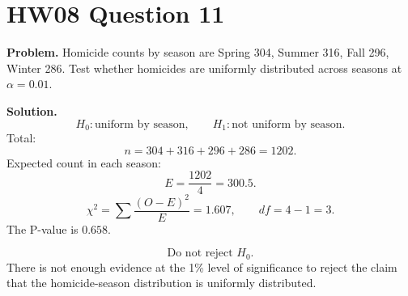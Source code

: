 \documentclass[11pt]{article}
\begin{document}
\section*{HW08 Question 11}

\textbf{Problem.} Homicide counts by season are Spring 304, Summer 316, Fall 296, Winter 286. Test whether homicides are uniformly distributed across seasons at \(\alpha=0.01\).

\textbf{Solution.}
\[
H_0:\text{uniform by season},\qquad H_1:\text{not uniform by season}.
\]
Total:
\[
n=304+316+296+286=1202.
\]
Expected count in each season:
\[
E=\frac{1202}{4}=300.5.
\]
\[
\chi^2=\sum\frac{(O-E)^2}{E}=1.607,\qquad df=4-1=3.
\]
The P-value is \(0.658\).

\[
\boxed{\text{Do not reject }H_0.}
\]
There is not enough evidence at the 1\% level of significance to reject the claim that the homicide-season distribution is uniformly distributed.
\end{document}
